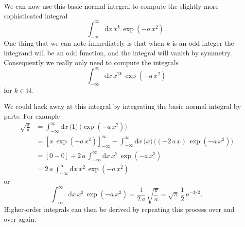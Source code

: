 \documentclass[
  letterpaper,
  DIV=11,
  numbers=noendperiod]{scrartcl}
\begin{document}
We can now use this basic normal integral to compute the slightly more
sophisticated integral \[
\int_{-\infty}^{\infty} \mathrm{d} x \,
x^{k} \, \exp \left( -a \, x^{2} \right).
\] One thing that we can note immediately is that when \(k\) is an odd
integer the integrand will be an odd function, and the integral will
vanish by symmetry. Consequently we really only need to compute the
integrals \[
\int_{-\infty}^{\infty} \mathrm{d} x \,
x^{2 k} \, \exp \left( -a \, x^{2} \right)
\] for \(k \in \mathbb{N}\).

We could hack away at this integral by integrating the basic normal
integral by parts. For example \begin{align*}
\sqrt{ \frac{\pi}{a} }
&=
\int_{-\infty}^{\infty} \mathrm{d} x \,
\big( 1 \big) \,
\big( \exp \left( -a \, x^{2} \right) \big)
\\
&=
\left[ x \, \exp \left( -a \, x^{2} \right) \right]_{-\infty}^{\infty}
- \int_{-\infty}^{\infty} \mathrm{d} x \,
\big( x \big) \,
\big( (- 2 \, a \, x) \, \exp \left( -a \, x^{2} \right) \big)
\\
&=
\left[ 0 - 0 \right]
+ 2 \, a \, \int_{-\infty}^{\infty} \mathrm{d} x \,
x^{2} \, \exp \left( -a \, x^{2} \right)
\\
&=
2 \, a \, \int_{-\infty}^{\infty} \mathrm{d} x \,
x^{2} \, \exp \left( -a \, x^{2} \right)
\end{align*} or \[
\int_{-\infty}^{\infty} \mathrm{d} x \,
x^{2} \, \exp \left( -a \, x^{2} \right)
=
\frac{1}{2 \, a} \, \sqrt{ \frac{\pi}{a} }
=
\sqrt{\pi} \, \frac{1}{2} \, a^{-3/2}.
\] Higher-order integrals can then be derived by repeating this process
over and over again.
\end{document}
